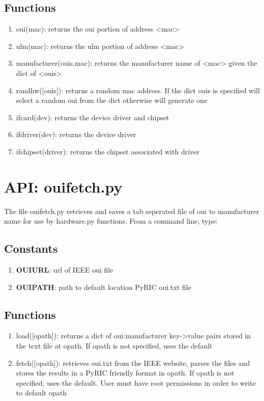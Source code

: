 \documentclass[11pt]{article}
\begin{document}
\begin{appendices}
\subsection{Functions}
\begin{enumerate}
\item oui(mac): returns the oui portion of address <mac>
\item ulm(mac): returns the ulm portion of address <mac>
\item manufacturer(ouis,mac): returns the manufacturer name of <mac> given the
dict of <ouis>
\item randhw([ouis]): returns a random mac address. If the dict ouis is specified 
will select a random oui from the dict otherwise will generate one
\item ifcard(dev): returns the device driver and chipset
\item ifdriver(dev): returns the device driver
\item ifchipset(driver): returns the chipset associated with driver
\end{enumerate}

\section{API: ouifetch.py}
The file ouifetch.py retrieves and saves a tab seperated file of oui to 
manufacturer name for use by hardware.py functions. From a command line, type: \\

\subsection{Constants}
\begin{enumerate}
\item \textbf{OUIURL}: url of IEEE oui file
\item \textbf{OUIPATH}: path to default location PyRIC oui.txt file
\end{enumerate}

\subsection{Functions}
\begin{enumerate}
\item load([opath]): returns a dict of oui:manufacturer key->value pairs stored
in the text file at opath. If opath is not specified, uses the default
\item fetch([opath]): retrieves oui.txt from the IEEE website, parses the files
and stores the results in a PyRIC friendly format in opath. If opath is not 
specified, uses the default. User must have root permissions in order to write
to default opath 
\end{enumerate}


\end{appendices}
\end{document}
